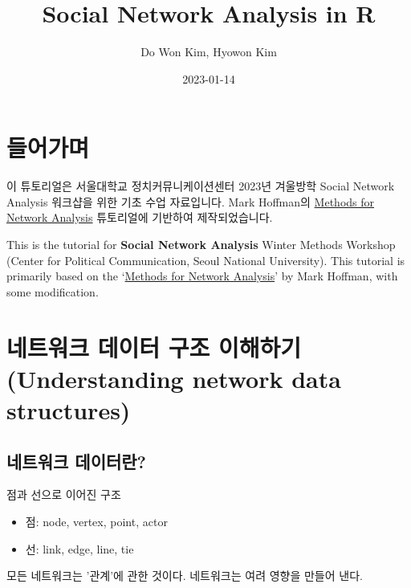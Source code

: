 \documentclass[
]{book}
\title{Social Network Analysis in R}
\author{Do Won Kim, Hyowon Kim}
\date{2023-01-14}
\providecommand{\tightlist}{%
  \setlength{\itemsep}{0pt}\setlength{\parskip}{0pt}}
\begin{document}
\maketitle

{
\setcounter{tocdepth}{1}
\tableofcontents
}
\hypertarget{uxb4e4uxc5b4uxac00uxba70}{%
\chapter{들어가며}\label{uxb4e4uxc5b4uxac00uxba70}}

이 튜토리얼은 서울대학교 정치커뮤니케이션센터 2023년 겨울방학 Social Network Analysis 워크샵을 위한 기초 수업 자료입니다. Mark Hoffman의 \href{https://bookdown.org/markhoff/social_network_analysis/}{Methods for Network Analysis} 튜토리얼에 기반하여 제작되었습니다.

This is the tutorial for \textbf{Social Network Analysis} Winter Methods Workshop (Center for Political Communication, Seoul National University). This tutorial is primarily based on the `\href{https://bookdown.org/markhoff/social_network_analysis/}{Methods for Network Analysis}' by Mark Hoffman, with some modification.

\hypertarget{uxb124uxd2b8uxc6ccuxd06c-uxb370uxc774uxd130-uxad6cuxc870-uxc774uxd574uxd558uxae30-understanding-network-data-structures}{%
\chapter{네트워크 데이터 구조 이해하기 (Understanding network data structures)}\label{uxb124uxd2b8uxc6ccuxd06c-uxb370uxc774uxd130-uxad6cuxc870-uxc774uxd574uxd558uxae30-understanding-network-data-structures}}

\hypertarget{uxb124uxd2b8uxc6ccuxd06c-uxb370uxc774uxd130uxb780}{%
\section{네트워크 데이터란?}\label{uxb124uxd2b8uxc6ccuxd06c-uxb370uxc774uxd130uxb780}}

점과 선으로 이어진 구조

\begin{itemize}
\tightlist
\item
  점: node, vertex, point, actor
\item
  선: link, edge, line, tie
\end{itemize}

모든 네트워크는 '관계'에 관한 것이다. 네트워크는 여려 영향을 만들어 낸다.
\end{document}
